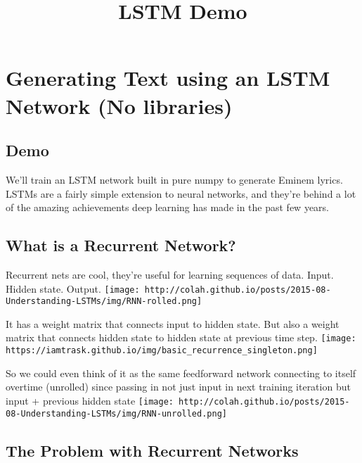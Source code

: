 \documentclass[11pt]{article}
\title{LSTM Demo}
\makeatletter
\def\maxwidth{\ifdim\Gin@nat@width>\linewidth\linewidth
    \else\Gin@nat@width\fi}
\let\Oldincludegraphics\includegraphics
\renewcommand{\includegraphics}[1]{\Oldincludegraphics[width=.8\maxwidth]{#1}}
\makeatother
\begin{document}
    
    
    \maketitle
    
    

    
    \hypertarget{generating-text-using-an-lstm-network-no-libraries}{%
\section{Generating Text using an LSTM Network (No
libraries)}\label{generating-text-using-an-lstm-network-no-libraries}}

\hypertarget{demo}{%
\subsection{Demo}\label{demo}}

We'll train an LSTM network built in pure numpy to generate Eminem
lyrics. LSTMs are a fairly simple extension to neural networks, and
they're behind a lot of the amazing achievements deep learning has made
in the past few years.

\hypertarget{what-is-a-recurrent-network}{%
\subsection{What is a Recurrent
Network?}\label{what-is-a-recurrent-network}}

Recurrent nets are cool, they're useful for learning sequences of data.
Input. Hidden state. Output.
\texttt{[image: http://colah.github.io/posts/2015-08-Understanding-LSTMs/img/RNN-rolled.png]}

It has a weight matrix that connects input to hidden state. But also a
weight matrix that connects hidden state to hidden state at previous
time step.
\texttt{[image: https://iamtrask.github.io/img/basic\_recurrence\_singleton.png]}

So we could even think of it as the same feedforward network connecting
to itself overtime (unrolled) since passing in not just input in next
training iteration but input + previous hidden state
\texttt{[image: http://colah.github.io/posts/2015-08-Understanding-LSTMs/img/RNN-unrolled.png]}

\hypertarget{the-problem-with-recurrent-networks}{%
\subsection{The Problem with Recurrent
Networks}\label{the-problem-with-recurrent-networks}}
\end{document}
